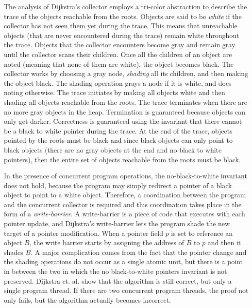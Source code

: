 The analysis of Dijkstra's collector employs a tri-color abstraction to describe the trace of the objects reachable from the roots. Objects are said to be {\em white} if the collector has not seen them yet during the trace. This means that unreachable objects (that are never encountered during the trace) remain white throughout the trace. Objects that the collector encounters become gray and remain gray until the collector scans their children. Once all the children of an object are noted (meaning that none of them are white), the object becomes black. The collector works by choosing a gray node, {\em shading} all its children, and then making the object black. The shading operation grays a node if it is white, and does noting otherwise. The trace initiates by making all objects white and then shading all objects reachable from the roots. The trace terminates when there are no more gray objects in the heap. Termination is guaranteed because objects can only get darker. Correctness is guaranteed using the invariant that there cannot be a black to white pointer during the trace. At the end of the trace, objects pointed by the roots must be black and since black objects can only point to black objects (there are no gray objects at the end and no black to white pointers), then the entire set of objects reachable from the roots must be black.

In the presence of concurrent program operations, the no-black-to-white invariant does not hold, because the program may simply redirect a pointer of a black object to point to a white object. Therefore, a coordination between the program and the concurrent collector is required and this coordination takes place in the form of a {\em write-barrier}. A write-barrier is a piece of code that executes with each pointer update, and Dijkstra's write-barrier lets the program shade the new target of a pointer modification.  When a pointer field $p$ is set to reference an object $B$, the write barrier starts by assigning the address of $B$ to $p$ and then it shades $B$. A major complication comes from the fact that the pointer change and the shading operations do not occur as a single atomic unit, but there is a point in between the two in which the no black-to-white pointers invariant is not preserved. Dijkstra et. al. show that the algorithm is still correct, but only a single program thread. If there are two concurrent program threads, the proof not only fails, but the algorithm actually becomes incorrect. 

